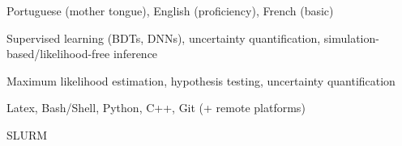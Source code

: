
\begin{cvskills}

{Portuguese (mother tongue), English (proficiency), French (basic)}

{Supervised learning (BDTs, DNNs), uncertainty quantification, simulation-based/likelihood-free inference}

{Maximum likelihood estimation, hypothesis testing, uncertainty quantification}

{Latex, Bash/Shell, Python, C++, Git (+ remote platforms)}

{SLURM}

\end{cvskills}
